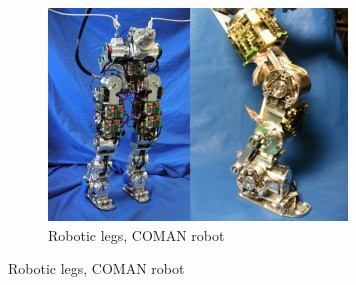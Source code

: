 \begin{figure}[h]
\begin{subfigure}[b]{0.3\textwidth}
        \includegraphics[width=\textwidth]{figures/robotic_leg.jpg}
        \caption{Robotic legs, COMAN robot \cite{coman}}
        \label{fig:robotic_leg}
    \end{subfigure}
\end{figure}



